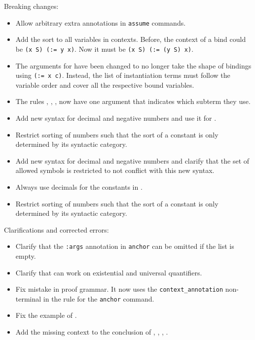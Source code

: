 \noindent
Breaking changes:
\begin{itemize}
  \item Allow arbitrary extra annotations in \texttt{assume} commands.
  \item Add the sort to all variables in contexts.  Before, the context
        of a bind could be \texttt{(x S) (:= y x)}.  Now it must
        be \texttt{(x S) (:= (y S) x)}.
  \item The arguments for  have been changed to
        no longer take the shape of bindings using \texttt{(:= x c)}.
        Instead, the list of instantiation terms must follow the variable
        order and cover all the respective bound variables.
  \item The rules , , ,
         now have one argument that indicates which subterm
        they use.
  \item Add new syntax for decimal and negative numbers and use it
        for .
  \item Restrict sorting of numbers such that the sort of a constant is
        only determined by its syntactic category.
  \item Add new syntax for decimal and negative numbers and clarify that
        the set of allowed symbols is restricted to not conflict with this
        new syntax.
  \item Always use decimals for the constants in .
  \item Restrict sorting of numbers such that the sort of a constant is
        only determined by its syntactic category.
\end{itemize}

\noindent
Clarifications and corrected errors:
\begin{itemize}
  \item Clarify that the \texttt{:args} annotation in \texttt{anchor} can be
        omitted if the list is empty.
  \item Clarify that  can work on existential and universal
        quantifiers.
  \item Fix mistake in proof grammar.  It now uses the \texttt{context\_annotation}
        non-terminal in the rule for the \texttt{anchor} command.
  \item Fix the example of .
  \item Add the missing context to the conclusion of ,
        , , .
\end{itemize}

